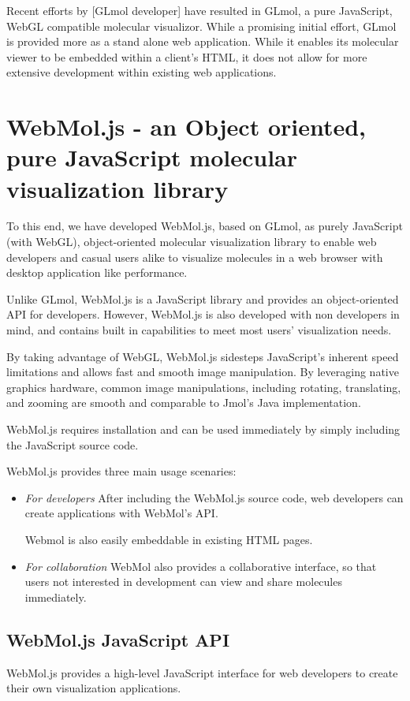 \documentclass[]{article}
\begin{document}
Recent efforts by [GLmol developer] have resulted in GLmol, a pure JavaScript, WebGL compatible molecular visualizor. While a promising initial effort, GLmol is provided more as a stand alone web application.  While it enables its molecular viewer to be embedded within a client's HTML, it does not allow for more extensive development within existing web applications.

\section{WebMol.js - an Object oriented, pure JavaScript molecular visualization library}
To this end, we have developed WebMol.js, based on GLmol, as purely JavaScript (with WebGL), object-oriented molecular visualization library to enable web developers and casual users alike to visualize molecules in a web browser with desktop application like performance.  

Unlike GLmol, WebMol.js is a JavaScript library and provides an object-oriented API for developers.  However, WebMol.js is also developed with non developers in mind, and contains built in capabilities to meet most users' visualization needs.

By taking advantage of WebGL, WebMol.js sidesteps JavaScript's inherent speed limitations and allows fast and smooth image manipulation.  By leveraging native graphics hardware, common image manipulations, including rotating, translating, and zooming are smooth and comparable to Jmol's Java implementation.

WebMol.js requires installation and can be used immediately by simply including the JavaScript source code.

WebMol.js provides three main usage scenaries:

\begin{itemize}
\item \emph{For developers}
After including the WebMol.js source code, web developers can create applications with WebMol's API.

Webmol is also easily embeddable in existing HTML pages.

\item \emph{For collaboration}
WebMol also provides a collaborative interface, so that users not interested in development can view and share molecules immediately.

\end{itemize}

\subsection{WebMol.js JavaScript API}
WebMol.js provides a high-level JavaScript interface for web developers to create their own visualization applications. 
\end{document}
